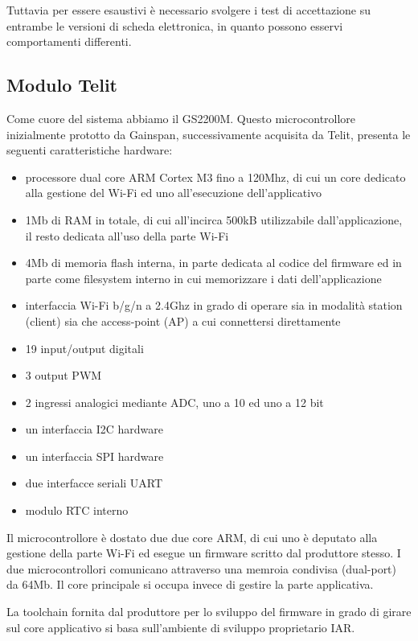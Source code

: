 \documentclass[12pt,a4paper,twoside,titlepage]{book}
\begin{document}
Tuttavia per essere esaustivi è necessario svolgere i test di accettazione su entrambe
le versioni di scheda elettronica, in quanto possono esservi comportamenti differenti.

\subsection{Modulo Telit}

Come cuore del sistema abbiamo il GS2200M. Questo microcontrollore inizialmente
prototto da Gainspan, successivamente acquisita da Telit, presenta le seguenti
caratteristiche hardware:

\begin{itemize}
    \item processore dual core ARM Cortex M3 fino a 120Mhz, di cui un core dedicato
        alla gestione del Wi-Fi ed uno all'esecuzione dell'applicativo
    \item 1Mb di RAM in totale, di cui all'incirca 500kB utilizzabile dall’applicazione,
        il resto dedicata all'uso della parte Wi-Fi
    \item 4Mb di memoria flash interna, in parte dedicata al codice del firmware ed
        in parte come filesystem interno in cui memorizzare i dati dell'applicazione
    \item interfaccia Wi-Fi b/g/n a 2.4Ghz in grado di operare sia in modalità station
        (client) sia che access-point (AP) a cui connettersi direttamente
    \item 19 input/output digitali
    \item 3 output PWM
    \item 2 ingressi analogici mediante ADC, uno a 10 ed uno a 12 bit
    \item un interfaccia I2C hardware
    \item un interfaccia SPI hardware
    \item due interfacce seriali UART
    \item modulo RTC interno
\end{itemize}

Il microcontrollore è dostato due due core ARM, di cui uno è deputato alla gestione
della parte Wi-Fi ed esegue un firmware scritto dal produttore stesso. I due microcontrollori
comunicano attraverso una memroia condivisa (dual-port) da 64Mb. Il core principale
si occupa invece di gestire la parte applicativa.

La toolchain fornita dal produttore per lo sviluppo del firmware in grado di girare
sul core applicativo si basa sull'ambiente di sviluppo proprietario IAR.
\end{document}
